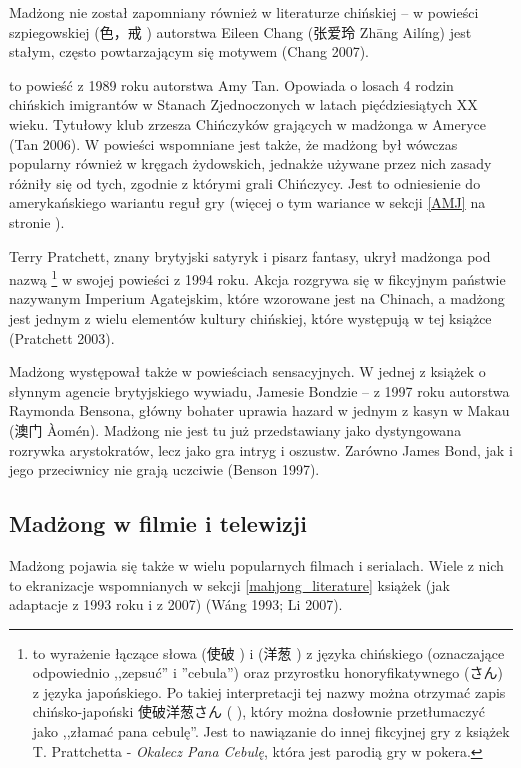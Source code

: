 Madżong nie został zapomniany również w literaturze chińskiej -- w
powieści szpiegowskiej  (色，戒 )
autorstwa Eileen Chang (张爱玲 Zhāng Ailíng) jest stałym, często powtarzającym się
motywem (Chang 2007).

 to powieść z 1989 roku autorstwa Amy Tan. Opowiada o
losach 4 rodzin chińskich imigrantów w Stanach Zjednoczonych w latach
pięćdziesiątych XX wieku. Tytułowy klub zrzesza Chińczyków grających w madżonga
w Ameryce (Tan 2006). W powieści wspomniane jest także, że madżong był wówczas
popularny również w kręgach żydowskich, jednakże używane przez nich zasady
różniły się od tych, zgodnie z którymi grali Chińczycy. Jest to odniesienie do
amerykańskiego wariantu reguł gry (więcej o tym wariance w sekcji
\ref{AMJ} na stronie \pageref{AMJ}). %

Terry Pratchett, znany brytyjski satyryk i pisarz fantasy, ukrył madżonga pod
nazwą \footnote{ to
wyrażenie łączące słowa  (使破 ) i 
(洋葱 ) z języka chińskiego (oznaczające odpowiednio ,,zepsuć'' i
''cebula'') oraz przyrostku honoryfikatywnego  (さん) z języka
japońskiego. Po takiej interpretacji tej nazwy można otrzymać zapis
chińsko-japoński 使破洋葱さん ( ), który można
dosłownie przetłumaczyć jako ,,złamać pana cebulę''. Jest to nawiązanie do
innej fikcyjnej gry z książek T. Prattchetta - \textit{Okalecz Pana Cebulę},
która jest parodią gry w pokera.} w swojej powieści  z 1994 roku.
Akcja rozgrywa się w fikcyjnym państwie nazywanym Imperium Agatejskim, które
wzorowane jest na Chinach, a madżong jest jednym z wielu elementów kultury
chińskiej, które występują w tej książce (Pratchett 2003).

Madżong występował także w powieściach sensacyjnych. W jednej z książek o
słynnym agencie brytyjskiego wywiadu, Jamesie Bondzie --  z 1997 roku autorstwa Raymonda Bensona, główny bohater uprawia hazard w
jednym z kasyn w Makau (澳门 Àomén). Madżong nie jest tu już przedstawiany jako
dystyngowana rozrywka arystokratów, lecz jako gra intryg i oszustw. Zarówno
James Bond, jak i jego przeciwnicy nie grają uczciwie (Benson 1997).

\subsection{Madżong w filmie i telewizji}
Madżong pojawia się także w wielu popularnych filmach i serialach. Wiele z nich
to ekranizacje wspomnianych w sekcji \ref{mahjong_literature} książek (jak
adaptacje  z 1993 roku i  z
2007) (Wáng 1993; Li 2007).

